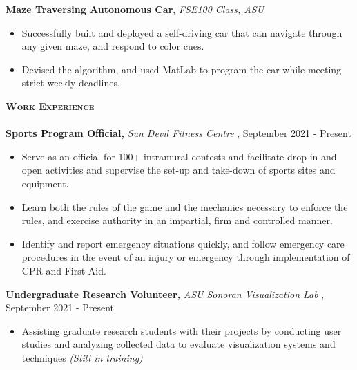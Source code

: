 \documentclass[a4paper]{article}
\newcommand{\lineunder} {
    \vspace*{-8pt} \\
    \hspace*{-18pt} \hrulefill \\
}
\newcommand{\header} [1] {
    {\hspace*{-15pt}\vspace*{3pt} \textsc{#1}}
    \vspace*{-6pt} \lineunder
}
\begin{document}
\textbf{Maze Traversing Autonomous Car}, \textit{FSE100 Class, ASU}
\begin{itemize}
    \item Successfully built and deployed a self-driving car that can navigate through any given maze, and respond to color cues. 
    \item Devised the algorithm, and used MatLab to program the car while meeting strict weekly deadlines. 
\end{itemize}

\vspace{2mm}
    \header{\textbf{Work Experience}}

\textbf{Sports Program Official, } \textit{{\href{https://fitness.asu.edu/programs/intramurals}{Sun Devil Fitness Centre}} \faExternalLink},   \hfill September 2021 - Present\\
\vspace{0mm}
\vspace{-1mm}
\begin{itemize}
    \item Serve as an official for 100+ intramural contests and facilitate drop-in and open activities and supervise the set-up and take-down of sports sites and equipment.
    \item Learn both the rules of the game and the mechanics necessary to enforce the rules, and exercise authority in an impartial, firm and controlled manner. 
    \item Identify and report emergency situations quickly, and follow emergency care procedures in the event of an injury or emergency through implementation of CPR and First-Aid. 
\end{itemize}

\textbf{Undergraduate Research Volunteer, } \textit{\href{https://news.asu.edu/20200225-solutions-data-driven-quest-resilient-power-systems}{ASU Sonoran Visualization Lab} \faExternalLink}, \hfill September 2021 - Present\\
\vspace{0mm}
\vspace{-1mm}
\begin{itemize}
    \item Assisting graduate research students with their projects by conducting user studies and analyzing collected data to evaluate visualization systems and techniques \textit{(Still in training)}
\end{itemize}
\end{document}

